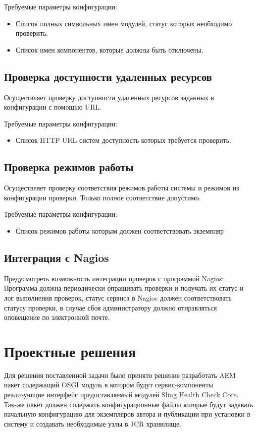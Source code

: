 Требуемые параметры конфигурации:
\begin{itemize}
\item Список полных символьных имен модулей, статус которых необходимо проверить.
\item Список имен компонентов, которые должны быть отключены.
\end{itemize}

\subsection{Проверка доступности удаленных ресурсов}
Осуществляет проверку доступности удаленных ресурсов заданных в конфигурации с помощью URL.

Требуемые параметры конфигурации:
\begin{itemize}
\item Список HTTP URL систем доступность которых требуется проверить.
\end{itemize}

\subsection{Проверка режимов работы}
Осуществляет проверку соответствия режимов работы системы и режимов из конфигурации проверки. Только полное соответствие допустимо.

Требуемые параметры конфигурации:
\begin{itemize}
\item Список режимов работы которым должен соответствовать экземпляр
\end{itemize}

\subsection{Интеграция с Nagios}
Предусмотреть возможность интеграции проверок с программой Nagios: Программа должна периодически опрашивать проверки и получать их статус и лог выполнения проверок, статус сервиса в Nagios должен соответствовать статусу проверки, в случае сбоя администратору должно отправляться оповещение по электронной почте.


\section{Проектные решения}
Для решения поставленной задачи было принято решение разработать AEM пакет содержащий OSGI модуль в котором будут сервис-компоненты реализующие интерфейс предоставляемый модулей Sling Health Check Core. Так-же пакет должен содержать конфигурационные файлы которые будут задавать начальную конфигурацию для экземпляров автора и публикации при установки в систему и создавать необходимые узлы в JCR хранилище.

